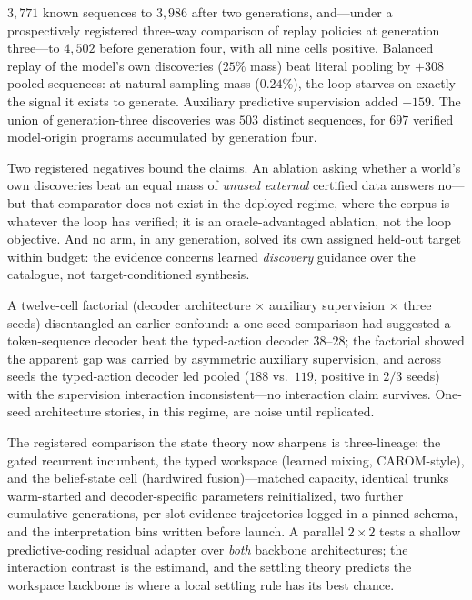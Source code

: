 \documentclass[11pt]{article}
\begin{document}
$3{,}771$ known sequences to $3{,}986$ after two generations, and---under a
prospectively registered three-way comparison of replay policies at generation
three---to $4{,}502$ before generation four, with all nine cells positive. Balanced
replay of the model's own discoveries ($25\%$ mass) beat literal pooling by $+308$
pooled sequences: at natural sampling mass ($0.24\%$), the loop starves on exactly the
signal it exists to generate. Auxiliary predictive supervision added $+159$. The union
of generation-three discoveries was $503$ distinct sequences, for $697$ verified
model-origin programs accumulated by generation four.

Two registered negatives bound the claims. An ablation asking whether a world's own
discoveries beat an equal mass of \emph{unused external} certified data answers
no---but that comparator does not exist in the deployed regime, where the corpus is
whatever the loop has verified; it is an oracle-advantaged ablation, not the loop
objective. And no arm, in any generation, solved its own assigned held-out target
within budget: the evidence concerns learned \emph{discovery} guidance over the
catalogue, not target-conditioned synthesis.

A twelve-cell factorial (decoder architecture $\times$ auxiliary supervision $\times$
three seeds) disentangled an earlier confound: a one-seed comparison had suggested a
token-sequence decoder beat the typed-action decoder $38$--$28$; the factorial showed
the apparent gap was carried by asymmetric auxiliary supervision, and across seeds the
typed-action decoder led pooled ($188$ vs.\ $119$, positive in $2/3$ seeds) with the
supervision interaction inconsistent---no interaction claim survives. One-seed
architecture stories, in this regime, are noise until replicated.

The registered comparison the state theory now sharpens is three-lineage: the gated
recurrent incumbent, the typed workspace (learned mixing, CAROM-style), and the
belief-state cell (hardwired fusion)---matched capacity, identical trunks warm-started
and decoder-specific parameters reinitialized, two further cumulative generations,
per-slot evidence trajectories logged in a pinned schema, and the interpretation bins
written before launch. A parallel $2\times2$ tests a shallow predictive-coding residual
adapter over \emph{both} backbone architectures; the interaction contrast is the
estimand, and the settling theory predicts the workspace backbone is where a local
settling rule has its best chance.
\end{document}
